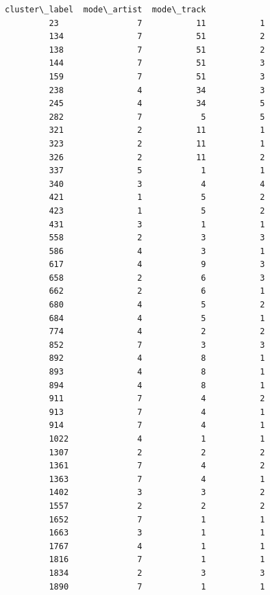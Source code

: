 \documentclass[11pt]{article}
\begin{document}
\begin{Verbatim}[commandchars=\\\{\}]
               cluster\_label  mode\_artist  mode\_track  
         23                7           11           1  
         134               7           51           2  
         138               7           51           2  
         144               7           51           3  
         159               7           51           3  
         238               4           34           3  
         245               4           34           5  
         282               7            5           5  
         321               2           11           1  
         323               2           11           1  
         326               2           11           2  
         337               5            1           1  
         340               3            4           4  
         421               1            5           2  
         423               1            5           2  
         431               3            1           1  
         558               2            3           3  
         586               4            3           1  
         617               4            9           3  
         658               2            6           3  
         662               2            6           1  
         680               4            5           2  
         684               4            5           1  
         774               4            2           2  
         852               7            3           3  
         892               4            8           1  
         893               4            8           1  
         894               4            8           1  
         911               7            4           2  
         913               7            4           1  
         914               7            4           1  
         1022              4            1           1  
         1307              2            2           2  
         1361              7            4           2  
         1363              7            4           1  
         1402              3            3           2  
         1557              2            2           2  
         1652              7            1           1  
         1663              3            1           1  
         1767              4            1           1  
         1816              7            1           1  
         1834              2            3           3  
         1890              7            1           1  
\end{Verbatim}
            
\end{document}
